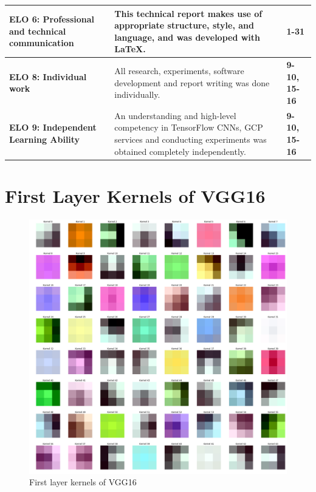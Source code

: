 \begin{table}[h]
\begin{tabularx}{\linewidth}{@{} R{4cm} X R{1.3cm} @{}}
        \midrule
        \textbf{ELO 6: Professional and technical communication} & This technical report makes use of appropriate structure, style, and language, and was developed with \LaTeX. & \textbf{1-31} \\
        \midrule
        \textbf{ELO 8: Individual work} & All research, experiments, software development and report writing was done individually.  & \textbf{9-10, 15-16} \\
        \midrule
        \textbf{ELO 9: Independent Learning Ability} & An understanding and high-level competency in TensorFlow CNNs, GCP services and conducting experiments was obtained completely independently. & \textbf{9-10, 15-16} \\
        \bottomrule
    \end{tabularx}
\label{tbl:elo}
\end{table}

\chapter{First Layer Kernels of VGG16}
\makeatletter{}\makeatother
\label{appen:conv1_1}

\begin{figure}[h]
    \centering
    \includegraphics[width=\linewidth]{appendices/fig/conv1_1.png}
    \caption{First layer kernels of VGG16}
    \label{fig:my_label}
\end{figure}

